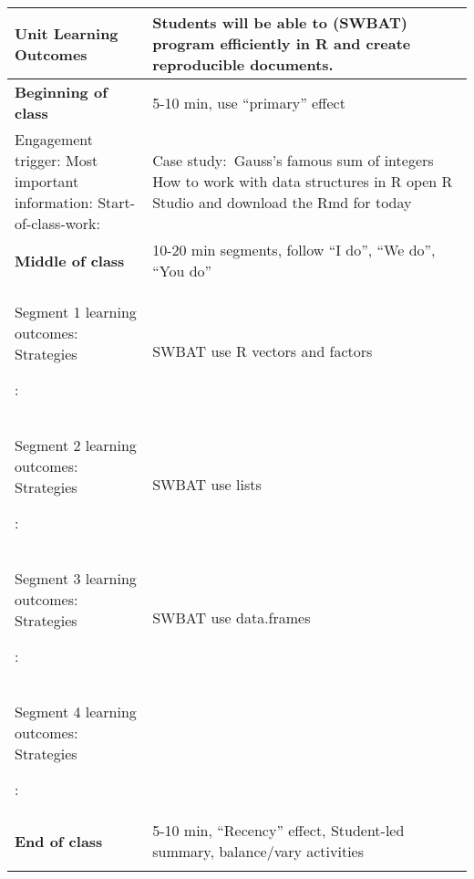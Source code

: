 \documentclass[letterpaper,11pt]{article}
\newcommand\Bshort{\rule[-5ex]{0pt}{0pt}} %
\newcommand\B{\rule[-10ex]{0pt}{0pt}} %
\begin{document}
\begin{tabular}{|p{0.3\linewidth} | p{0.7\linewidth}|}
  \hline
  \textbf{Unit Learning Outcomes} & Students will be able to (SWBAT) program efficiently in R and create reproducible documents. \\
  \hline
  \textbf{Beginning of class} & 5-10 min, use ``primary'' effect
  \\
  \hline
  Engagement trigger: 
  \newline Most important information: 
  \newline Start-of-class-work:
                                  & Case study:~Gauss's famous sum of integers
                                    \newline How to work with data structures in R 
                                    \newline open R Studio and download the Rmd for today
  \\
  \hline
  \textbf{Middle of class} & 10-20 min segments, follow ``I do'', ``We do'', ``You do''
  \\
  \hline
  Segment 1 learning outcomes: 
  \newline Strategies \B:

                                  & SWBAT use R vectors and factors
                                    \newline 
                                    \newline
                                    \newline
  \\
  Segment 2 learning outcomes: 
  \newline Strategies \B:
                                  & SWBAT use lists
                                    \newline 
                                    \newline
                                    \newline
  \\
  Segment 3 learning outcomes: 
  \newline Strategies \B:
                                  & SWBAT use data.frames
                                    \newline 
                                    \newline
                                    \newline
  \\
  Segment 4 learning outcomes:
  \newline Strategies \B:
                                  &
  \\
  \hline
  \textbf{End of class} & 5-10 min, ``Recency'' effect, Student-led summary, balance/vary activities \\
  \hline
  \Bshort
                                  & 
  \\
  \hline
\end{tabular}
\end{document}
